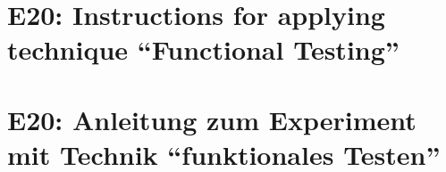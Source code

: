 
\ifenglish
\section*{E20: Instructions for applying technique ``Functional Testing''}

\fi
\ifgerman
\section*{E20: Anleitung zum Experiment mit Technik "`funktionales Testen"'}

\fi


